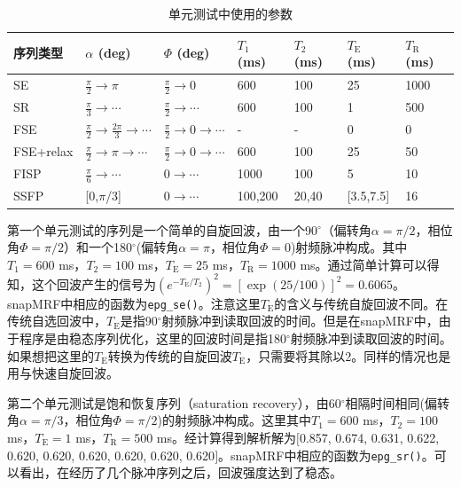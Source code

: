 \begin{table}
\centering
\caption{单元测试中使用的参数}
\begin{center}
\begin{tabular}{|l|l|l|l|l|l|l|}
\hline
\hline
序列类型 & $\alpha$ (deg) & $\Phi$ (deg) & $T_1$ (ms) & $T_2$ (ms) & $T_\mathrm{E}$ (ms) & $T_\mathrm{R}$ (ms)\\
\hline
SE & $\frac{\pi}{2}\rightarrow\pi$ & $\frac{\pi}{2}\rightarrow0$ & 600 & 100 & 25 & 1000\\
\hline
SR & $\frac{\pi}{3}\rightarrow\cdots$ & $\frac{\pi}{2}\rightarrow \cdots$ & 600 & 100 & 1 & 500\\
\hline
FSE & $\frac{\pi}{2}\rightarrow\frac{2\pi}{3}\rightarrow\cdots$ & $\frac{\pi}{2}\rightarrow0\rightarrow\cdots$ & - & - & 0 & 0\\
\hline
FSE+relax & $\frac{\pi}{2}\rightarrow\pi\rightarrow\cdots$ & $\frac{\pi}{2}\rightarrow0\rightarrow\cdots$ & 600 & 100 & 25 & 50\\
\hline
FISP & $\frac{\pi}{6}\rightarrow\cdots$ & $0\rightarrow\cdots$ & 1000 & 100 & 5 & 10\\
\hline
SSFP & [0,$\pi$/3] & $0\rightarrow\cdots$  & 100,200 & 20,40 & [3.5,7.5] & 16\\
\hline
\end{tabular}
\end{center}
\label{tab:unittest}
\end{table}

第一个单元测试的序列是一个简单的自旋回波，由一个90$^{\circ}$（偏转角$\alpha = \pi/2$，相位角$\Phi = \pi/2$）和一个180$^{\circ}$(偏转角$\alpha = \pi$，相位角$\Phi = 0$)射频脉冲构成。其中$T_1 = 600$ ms，$T_2 = 100$ ms，$T_\mathrm{E} = 25$ ms，$T_\mathrm{R} = 1000$ ms。通过简单计算可以得知，这个回波产生的信号为$(e^{-T_\mathrm{E}/T_2})^2 =[\exp(25/100)]^2=0.6065$。snapMRF中相应的函数为\texttt{epg\_se()}。注意这里$T_\mathrm{E}$的含义与传统自旋回波不同。在传统自选回波中，$T_\mathrm{E}$是指90$^{\circ}$射频脉冲到读取回波的时间。但是在snapMRF中，由于程序是由稳态序列优化，这里的回波时间是指180$^{\circ}$射频脉冲到读取回波的时间。如果想把这里的$T_\mathrm{E}$转换为传统的自旋回波$T_\mathrm{E}$，只需要将其除以2。同样的情况也是用与快速自旋回波。

第二个单元测试是饱和恢复序列（saturation recovery），由60$^{\circ}$相隔时间相同(偏转角$\alpha = \pi/3$，相位角$\Phi = \pi/2$)的射频脉冲构成。这里其中$T_1 = 600$ ms，$T_2 = 100$ ms，$T_\mathrm{E} = 1$ ms，$T_\mathrm{R} = 500$ ms。经计算得到解析解为$[$0.857, 0.674, 0.631, 0.622, 0.620, 0.620, 0.620, 0.620, 0.620, 0.620$]$。snapMRF中相应的函数为\texttt{epg\_sr()}。可以看出，在经历了几个脉冲序列之后，回波强度达到了稳态。

